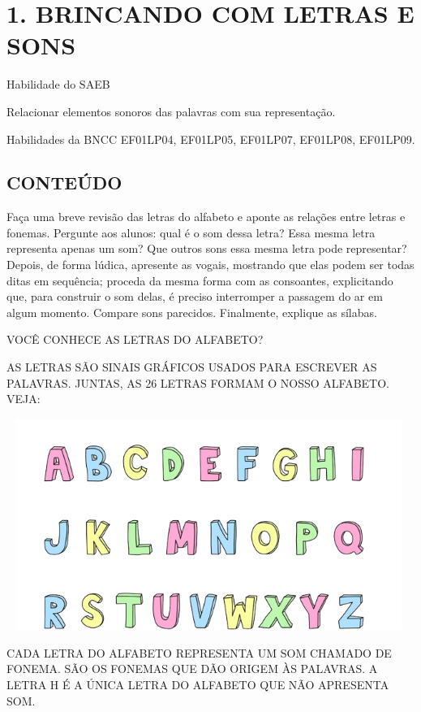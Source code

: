 \section{1. BRINCANDO COM LETRAS E SONS
}\label{muxf3dulo-1-brincando-com-letras-e-sons}

Habilidade do SAEB

Relacionar elementos sonoros das palavras com sua representação.

Habilidades da BNCC
EF01LP04, EF01LP05, EF01LP07, EF01LP08, EF01LP09.

\subsection{CONTEÚDO}\label{conteuxfado}

Faça uma breve revisão das letras do alfabeto e aponte as relações entre
letras e fonemas. Pergunte aos alunos: qual é o som dessa letra? Essa
mesma letra representa apenas um som? Que outros sons essa mesma letra
pode representar? Depois, de forma lúdica, apresente as vogais,
mostrando que elas podem ser todas ditas em sequência; proceda da mesma
forma com as consoantes, explicitando que, para
construir o som delas, é preciso interromper a passagem do ar em algum
momento. Compare sons parecidos. Finalmente, explique as sílabas.

VOCÊ CONHECE AS LETRAS DO ALFABETO?

AS LETRAS SÃO SINAIS GRÁFICOS USADOS PARA ESCREVER AS PALAVRAS. JUNTAS,
AS 26 LETRAS FORMAM O NOSSO ALFABETO. VEJA:

\includegraphics[width=5.19167in,height=2.71250in]{media/image1.png}

CADA LETRA DO ALFABETO REPRESENTA UM SOM CHAMADO DE FONEMA. SÃO OS FONEMAS QUE DÃO ORIGEM ÀS PALAVRAS. A LETRA H É A ÚNICA LETRA DO ALFABETO QUE NÃO
APRESENTA SOM.

